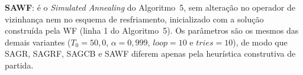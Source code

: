 
\textbf{SAWF}: \'e o \textit{Simulated Annealing} do Algoritmo~5, sem altera\c{c}\~ao no operador de
vizinhan\c{c}a nem no esquema de resfriamento, inicializado com a solu\c{c}\~ao constru\'ida pela WF
(linha 1 do Algoritmo~5). Os par\^ametros s\~ao os mesmos das demais variantes
($T_0 = 50{,}0$, $\alpha = 0{,}999$, $\mathit{loop} = 10$ e $\mathit{tries} = 10$), de modo que SAGR,
SAGRF, SAGCB e SAWF diferem apenas pela heur\'istica construtiva de partida.

%

%
%
